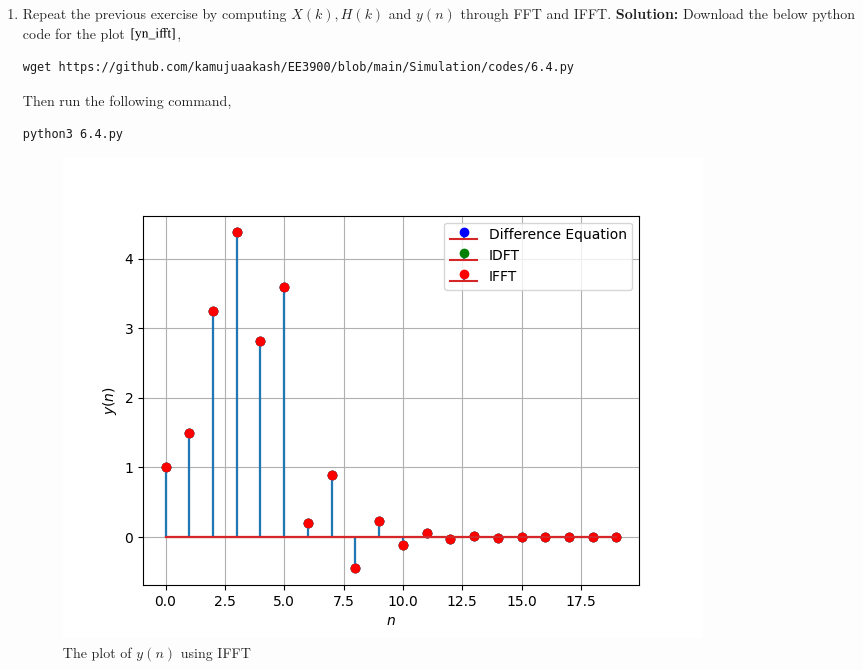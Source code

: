 \documentclass[journal,12pt,twocolumn]{IEEEtran}
\newcommand{\solution}{\noindent \textbf{Solution: }}
\providecommand{\brak}[1]{\ensuremath{\left(#1\right)}}
\numberwithin{equation}{section}
\renewcommand\thesection{\arabic{section}}
\begin{document}
\begin{enumerate}[label=\thesection.\arabic*]
\item Repeat the previous exercise by computing $X(k), H(k)$ and $y(n)$ through FFT and 
IFFT.
\solution Download the below python code for the plot $\ref{yn_ifft}$,
  \begin{lstlisting}
wget https://github.com/kamujuaakash/EE3900/blob/main/Simulation/codes/6.4.py
  \end{lstlisting}
  Then run the following command,
   \begin{lstlisting}
python3 6.4.py
   \end{lstlisting}
  \begin{figure}[!ht]
     \includegraphics[width=\columnwidth]{./figs/6.4}
     \centering
    \caption{The plot of $y\brak{n}$ using IFFT}
    \label{yn_ifft}
 \end{figure}
\end{enumerate}
%
\end{document}
